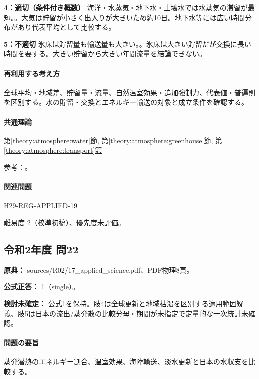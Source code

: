 \noindent\textbf{4：適切（条件付き概数）} 海洋・水蒸気・地下水・土壌水では水蒸気の滞留が最短。。大気は貯留が小さく出入りが大きいため約10日。地下水等には広い時間分布があり代表平均として比較する。\par

\noindent\textbf{5：不適切} 氷床は貯留量も輸送量も大きい。。氷床は大きい貯留だが交換に長い時間を要する。大きい貯留から大きい年間流量を結論できない。\par

\paragraph{再利用する考え方} 全球平均・地域差、貯留量・流量、自然温室効果・追加強制力、代表値・普遍則を区別する。水の貯留・交換とエネルギー輸送の対象と成立条件を確認する。

\paragraph{共通理論} \hyperref[theory:atmosphere:water]{第\ref*{theory:atmosphere:water}節}, \hyperref[theory:atmosphere:greenhouse]{第\ref*{theory:atmosphere:greenhouse}節}, \hyperref[theory:atmosphere:transport]{第\ref*{theory:atmosphere:transport}節}

\par 参考：\cite{atm_usgs_water,atm_usgs_cycle,atm_jma_ghg2012}。

\paragraph{関連問題} \hyperref[q:h29-reg-applied-19]{H29-REG-APPLIED-19}

\par 難易度 2（校準初稿）、優先度未評価。

\subsection{令和2年度 問22}
\label{q:r02-reg-applied-22}

\noindent\textbf{原典：} sources/R02/17\_applied\_science.pdf、PDF物理8頁。

\textbf{公式正答：} 1（single）。

\par\textbf{検討未確定：} 公式1を保持。肢4は全球更新と地域枯渇を区別する適用範囲疑義、肢5は日本の流出/蒸発散の比較分母・期間が未指定で定量的な一次統計未確認。

\paragraph{問題の要旨} 蒸発潜熱のエネルギー割合、温室効果、海陸輸送、淡水更新と日本の水収支を比較する。

